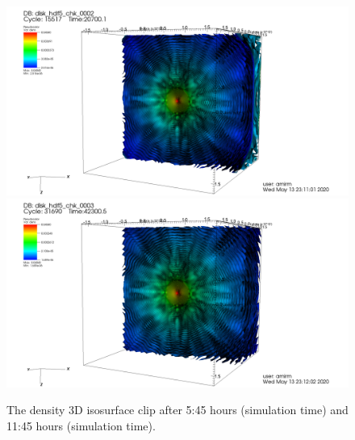 \documentclass[12pt, a4paper]{article}
\begin{document}
\begin{figure}[ht!]
    \begin{center}
        \includegraphics[width=1.0\textwidth]{density-3d-5-75.png}
        \includegraphics[width=1.0\textwidth]{density-3d-11-75.png}
    \end{center}
    \caption{
        The density 3D isosurface clip after 5:45 hours (simulation time) and 11:45 hours (simulation time).
    }\label{fig:dens-3d-t5-t11}
\end{figure}
\end{document}

